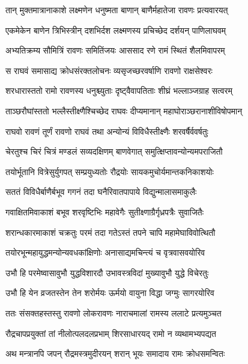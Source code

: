 \twolineshloka
{तान् मुक्तमात्रानाकाशे लक्ष्मणेन धनुष्मता}
{बाणान् बाणैर्महातेजा रावणः प्रत्यवारयत्} %

\twolineshloka
{एकमेकेन बाणेन त्रिभिस्त्रीन् दशभिर्दश}
{लक्ष्मणस्य प्रचिच्छेद दर्शयन् पाणिलाघवम्} %

\twolineshloka
{अभ्यतिक्रम्य सौमित्रिं रावणः समितिंजयः}
{आससाद रणे रामं स्थितं शैलमिवापरम्} %

\twolineshloka
{स राघवं समासाद्य क्रोधसंरक्तलोचनः}
{व्यसृजच्छरवर्षाणि रावणो राक्षसेश्वरः} %

\twolineshloka
{शरधारास्ततो रामो रावणस्य धनुश्च्युताः}
{दृष्ट्वैवापतिताः शीघ्रं भल्लाञ्जग्राह सत्वरम्} %

\twolineshloka
{ताञ्छरौघांस्ततो भल्लैस्तीक्ष्णैश्चिच्छेद राघवः}
{दीप्यमानान् महाघोराञ्छरानाशीविषोपमान्} %

\twolineshloka
{राघवो रावणं तूर्णं रावणो राघवं तथा}
{अन्योन्यं विविधैस्तीक्ष्णैः शरवर्षैर्ववर्षतुः} %

\twolineshloka
{चेरतुश्च चिरं चित्रं मण्डलं सव्यदक्षिणम्}
{बाणवेगात् समुत्क्षिप्तावन्योन्यमपराजितौ} %

\twolineshloka
{तयोर्भूतानि वित्रेसुर्युगपत् सम्प्रयुध्यतोः}
{रौद्रयोः सायकमुचोर्यमान्तकनिकाशयोः} %

\twolineshloka
{सततं विविधैर्बाणैर्बभूव गगनं तदा}
{घनैरिवातपापाये विद्युन्मालासमाकुलैः} %

\twolineshloka
{गवाक्षितमिवाकाशं बभूव शरवृष्टिभिः}
{महावेगैः सुतीक्ष्णाग्रैर्गृध्रपत्रैः सुवाजितैः} %

\twolineshloka
{शरान्धकारमाकाशं चक्रतुः परमं तदा}
{गतेऽस्तं तपने चापि महामेघाविवोत्थितौ} %

\twolineshloka
{तयोरभून्महायुद्धमन्योन्यवधकांक्षिणोः}
{अनासाद्यमचिन्त्यं च वृत्रवासवयोरिव} %

\twolineshloka
{उभौ हि परमेष्वासावुभौ युद्धविशारदौ}
{उभावस्त्रविदां मुख्यावुभौ युद्धे विचेरतुः} %

\twolineshloka
{उभौ हि येन व्रजतस्तेन तेन शरोर्मयः}
{ऊर्मयो वायुना विद्धा जग्मुः सागरयोरिव} %

\twolineshloka
{ततः संसक्तहस्तस्तु रावणो लोकरावणः}
{नाराचमालां रामस्य ललाटे प्रत्यमुञ्चत} %

\twolineshloka
{रौद्रचापप्रयुक्तां तां नीलोत्पलदलप्रभाम्}
{शिरसाधारयद् रामो न व्यथामभ्यपद्यत} %

\twolineshloka
{अथ मन्त्रानपि जपन् रौद्रमस्त्रमुदीरयन्}
{शरान् भूयः समादाय रामः क्रोधसमन्वितः} %

